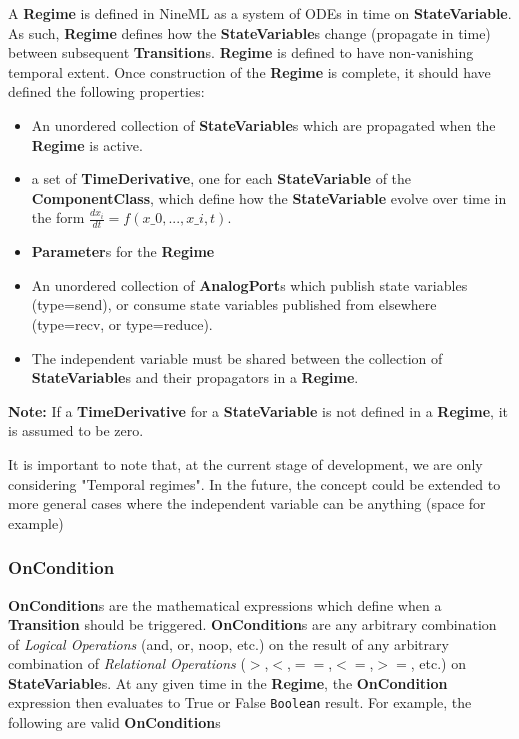 \documentclass{article}
\newcommand{\note}[1]{%
\begin{center}
\colorbox{issuecolor}{\parbox{0.8\linewidth}{\textbf{Note:} #1}}
\end{center}%
}
\newcommand{\nmlClass}[1]{{\bf #1}}
\newcommand{\ComponentClass}{{\bf{ComponentClass}}\xspace}
\newcommand{\StateVariable}{{\bf{StateVariable}}\xspace}
\newcommand{\StateVariables}{{\bf{StateVariable}}s\xspace}
\newcommand{\TimeDerivative}{{\bf{TimeDerivative}}\xspace}
\newcommand{\Regime}{{\bf{Regime}}\xspace}
\newcommand{\Transitions}{{\bf{Transition}}s\xspace}
\begin{document}
A \Regime is defined in NineML as a system of ODEs in time
on \StateVariable.  As such, \Regime defines how the \StateVariables
change (propagate in time) between subsequent \Transitions. \Regime is
defined to have non-vanishing temporal extent. Once construction of
the \Regime is complete, it should have defined the following
properties:

\begin{itemize}
\item An unordered collection of \nmlClass{StateVariable}s which are
propagated when the \nmlClass{Regime} is active.
\item a set of \TimeDerivative, one for each \StateVariable
of the \ComponentClass, which define how the \StateVariable
evolve over time in the form $\frac{dx_{i}}{dt} = f(x\_0, ..., x\_i, t)$.
\item \nmlClass{Parameter}s for the \nmlClass{Regime}
\item An unordered collection of \nmlClass{AnalogPort}s which publish state
variables (type=send), or consume state variables published from elsewhere
(type=recv, or type=reduce).
\item The independent variable must be shared between the collection
of \nmlClass{StateVariable}s and their propagators in a \Regime.
\end{itemize}

\note{If a \nmlClass{TimeDerivative} for a \StateVariable is not defined
in a \Regime, it is assumed to be zero.}

It is important to note that, at the current stage of development, we are only
considering "Temporal regimes". In the future, the concept could be extended
to more general cases where the independent variable can be anything (space
for example)

\subsubsection{OnCondition}

\nmlClass{OnCondition}s are the mathematical expressions which define
when a \nmlClass{Transition} should be triggered.
\nmlClass{OnCondition}s are any arbitrary combination of \emph{Logical
Operations} (and, or, noop, etc.) on the
result of any arbitrary combination of \emph{Relational Operations}
($>$,$<$,$==$,$<=$,$>=$, etc.) on
\nmlClass{StateVariable}s. At any given time in the \nmlClass{Regime},
the \nmlClass{OnCondition} expression then evaluates to True or False
{\tt Boolean} result. For example, the following are valid
\nmlClass{OnCondition}s
\end{document}
